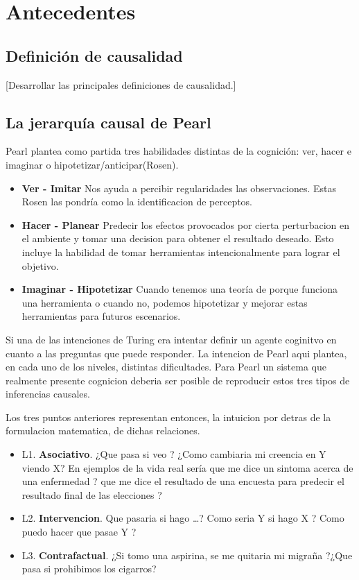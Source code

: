 \chapter{Antecedentes}

\section{Definición de causalidad}
[Desarrollar las principales definiciones de causalidad.]

\section{La jerarquía causal de Pearl}
Pearl plantea como partida tres habilidades distintas de la cognición: ver, hacer e imaginar
o hipotetizar/anticipar(Rosen). \cite{pearl2018bookOfWhy}
\begin{itemize}
    \item \textbf{Ver - Imitar} Nos ayuda a percibir regularidades las observaciones. Estas
Rosen las pondría como la identificacion de perceptos. 
    \item \textbf{Hacer - Planear} Predecir los efectos provocados por cierta perturbacion en el ambiente
y tomar una decision para obtener el resultado deseado. Esto incluye la habilidad de
tomar herramientas intencionalmente para lograr el objetivo. 
    \item \textbf{Imaginar - Hipotetizar} Cuando tenemos una teoría de porque funciona una herramienta o cuando no, 
podemos hipotetizar y mejorar estas herramientas para futuros escenarios. 
\end{itemize}

Si una de las intenciones de Turing era intentar definir un agente coginitvo en cuanto a
las preguntas que puede responder. La intencion de Pearl aqui plantea, en cada uno de los 
niveles, distintas dificultades. Para Pearl un sistema que realmente presente cognicion 
deberia ser posible de reproducir estos tres tipos de inferencias causales. 

Los tres puntos anteriores representan entonces, la intuicion por detras de la 
formulacion matematica, de dichas relaciones. 

\begin{itemize}
    \item L1. \textbf{Asociativo}. ¿Que pasa si veo ? ¿Como cambiaria mi creencia en Y viendo X? En ejemplos 
    de la vida real sería que me dice un sintoma acerca de una enfermedad ? que me dice el resultado de una encuesta para predecir 
    el resultado final de las elecciones ? 
    \item L2. \textbf{Intervencion}. Que pasaria si hago \dots ? Como seria Y si hago X ? Como puedo hacer que pasae Y ?
    \item L3. \textbf{Contrafactual}. ¿Si tomo una aspirina, se me quitaria mi migraña ?¿Que pasa si prohibimos los cigarros?
\end{itemize}

